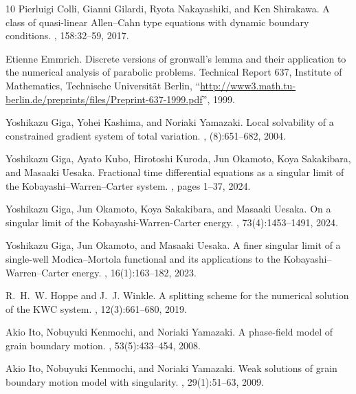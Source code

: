 \documentclass{sinst}
\numberwithin{equation}{section}
\theoremstyle{plain}
\theoremstyle{definition}
\begin{document}
\begin{thebibliography}{10}
Pierluigi Colli, Gianni Gilardi, Ryota Nakayashiki, and Ken Shirakawa.
\newblock A class of quasi-linear {A}llen--{C}ahn type equations with dynamic
  boundary conditions.
, 158:32--59, 2017.

Etienne Emmrich.
\newblock Discrete versions of gronwall's lemma and their application to the
  numerical analysis of parabolic problems.
\newblock Technical Report 637, Institute of Mathematics, Technische
  Universit\"{a}t Berlin,
  ``\href{http://www3.math.tu-berlin.de/preprints/files/Preprint-637-1999.pdf}{http://www3.math.tu-berlin.de/preprints/files/Preprint-637-1999.pdf}'',
  1999.

Yoshikazu Giga, Yohei Kashima, and Noriaki Yamazaki.
\newblock Local solvability of a constrained gradient system of total
  variation.
, (8):651--682, 2004.

Yoshikazu Giga, Ayato Kubo, Hirotoshi Kuroda, Jun Okamoto, Koya Sakakibara, and
  Masaaki Uesaka.
\newblock Fractional time differential equations as a singular limit of the
  {K}obayashi--{W}arren--{C}arter system.
, pages 1--37, 2024.

Yoshikazu Giga, Jun Okamoto, Koya Sakakibara, and Masaaki Uesaka.
\newblock On a singular limit of the {K}obayashi-{W}arren-{C}arter energy.
, 73(4):1453--1491, 2024.

Yoshikazu Giga, Jun Okamoto, and Masaaki Uesaka.
\newblock A finer singular limit of a single-well {M}odica--{M}ortola
  functional and its applications to the {K}obayashi--{W}arren--{C}arter
  energy.
, 16(1):163--182, 2023.

R.~H.~W. Hoppe and J.~J. Winkle.
\newblock A splitting scheme for the numerical solution of the {K}{W}{C}
  system.
, 12(3):661--680, 2019.

Akio Ito, Nobuyuki Kenmochi, and Noriaki Yamazaki.
\newblock A phase-field model of grain boundary motion.
, 53(5):433--454, 2008.

Akio Ito, Nobuyuki Kenmochi, and Noriaki Yamazaki.
\newblock Weak solutions of grain boundary motion model with singularity.
, 29(1):51--63, 2009.


\end{thebibliography}
\end{document}
